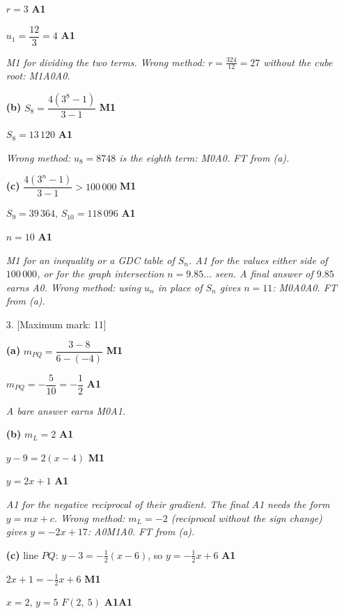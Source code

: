 \documentclass[12pt, twoside]{article}
\begin{document}
\begin{enumerate}[itemsep=0.3cm]
$r = 3$ \hfill \textbf{A1}

$u_{1} = \dfrac{12}{3} = 4$ \hfill \textbf{A1}

\emph{M1 for dividing the two terms. Wrong method: $r = \frac{324}{12} = 27$
without the cube root: M1A0A0.}

\textbf{(b)} $S_{8} = \dfrac{4\left(3^{8} - 1\right)}{3 - 1}$ \hfill \textbf{M1}

$S_{8} = 13\,120$ \hfill \textbf{A1}

\emph{Wrong method: $u_{8} = 8748$ is the eighth term: M0A0. FT from
(a).}

\textbf{(c)} $\dfrac{4\left(3^{n} - 1\right)}{3 - 1} > 100\,000$ \hfill \textbf{M1}

$S_{9} = 39\,364$, \quad $S_{10} = 118\,096$ \hfill \textbf{A1}

$n = 10$ \hfill \textbf{A1}

\emph{M1 for an inequality or a GDC table of $S_{n}$. A1 for the values
either side of $100\,000$, or for the graph intersection $n = 9.85\ldots$
seen. A final answer of $9.85$ earns A0. Wrong method: using $u_{n}$ in
place of $S_{n}$ gives $n = 11$: M0A0A0. FT from (a).}

\newpage

\item[3.] [Maximum mark: 11]

\textbf{(a)} $m_{PQ} = \dfrac{3 - 8}{6 - (-4)}$ \hfill \textbf{M1}

$m_{PQ} = -\dfrac{5}{10} = -\dfrac{1}{2}$ \hfill \textbf{A1}

\emph{A bare answer earns M0A1.}

\textbf{(b)} $m_{L} = 2$ \hfill \textbf{A1}

$y - 9 = 2(x - 4)$ \hfill \textbf{M1}

$y = 2x + 1$ \hfill \textbf{A1}

\emph{A1 for the negative reciprocal of their gradient. The final A1 needs
the form $y = mx + c$. Wrong method: $m_{L} = -2$ (reciprocal without the
sign change) gives $y = -2x + 17$: A0M1A0. FT from (a).}

\textbf{(c)} line $PQ$: $y - 3 = -\frac{1}{2}(x - 6)$, so $y = -\frac{1}{2}x + 6$ \hfill \textbf{A1}

$2x + 1 = -\frac{1}{2}x + 6$ \hfill \textbf{M1}

$x = 2$, \quad $y = 5$ \qquad $F(2,\ 5)$ \hfill \textbf{A1A1}


\end{enumerate}
\end{document}
